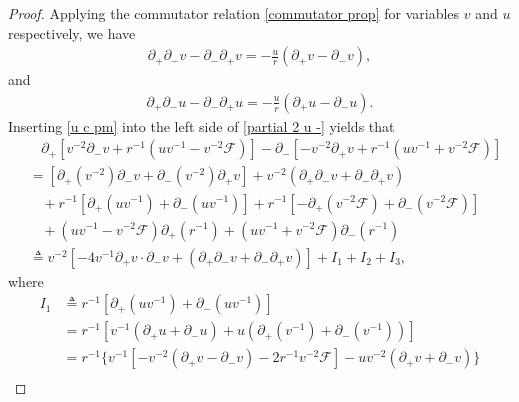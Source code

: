 \documentclass[10pt,leqno]{amsart}
\numberwithin{equation}{section}
\begin{document}
\begin{proof}
	Applying the commutator relation \eqref{commutator prop} for variables $v$ and $u$ respectively, we have
	\begin{equation}\label{partial 2 - }
		\begin{aligned}
			\partial_{+} \partial_{-} v - \partial_{-} \partial_{+} v =- \frac{u}{r} \left(  \partial_{+}v - \partial_{-}v\right)   ,
		\end{aligned}
	\end{equation}
	and
	\begin{equation} \label{partial 2 u -}
		\begin{aligned}
			\partial_{+} \partial_{-} u - \partial_{-} \partial_{+} u = - \frac{u}{r} (\partial_{+}u - \partial_{-}u).
		\end{aligned}
	\end{equation}
	Inserting \eqref{u c pm} into the left side of \eqref{partial 2 u -} yields that
	\begin{equation}\label{I123}
		\begin{aligned}
			& \ \ \ \ \partial_{+} [v^{-2} \partial_{-} v + r^{-1} (uv^{-1}-v^{-2} \mathcal{F})]  - \partial_{-} [-v^{-2} \partial_{+} v + r^{-1} (uv^{-1}+v^{-2} \mathcal{F})]  \\
			& = [\partial_{+} (v^{-2}) \partial_{-} v + \partial_{-} (v^{-2}) \partial_{+} v] + v^{-2} (\partial_{+} \partial_{-} v + \partial_{-} \partial_{+} v) \\
			& \ \ \ \  + r^{-1} [ \partial_{+} (uv^{-1}) + \partial_{-} (uv^{-1}) ]  + r^{-1} [ -\partial_{+} (v^{-2}\mathcal{F}) + \partial_{-} (v^{-2}\mathcal{F}) ] \\
			& \ \ \ \  + (uv^{-1} - v^{-2} \mathcal{F})\partial_{+} (r^{-1}) + (uv^{-1} + v^{-2} \mathcal{F})\partial_{-} (r^{-1})  \\
			& \triangleq  v^{-2} [ -4 v^{-1}\partial_{+} v \cdot \partial_{-} v  + (\partial_{+} \partial_{-} v + \partial_{-} \partial_{+} v) ] + I_{1} + I_{2} + I_{3},
		\end{aligned}
	\end{equation}
	where 
	\begin{equation} \label{I1}
		\begin{aligned}
			I_{1} & \triangleq r^{-1} [ \partial_{+} (uv^{-1}) + \partial_{-} (uv^{-1}) ] \\
			& = r^{-1} [ v^{-1} (\partial_{+}u + \partial_{-}u) + u ( \partial_{+} (v^{-1}) + \partial_{-} (v^{-1}) ) ] \\
			& = r^{-1} \{v^{-1} [- v^{-2} ( \partial_{+}v-\partial_{-}v) - 2r^{-1}v^{-2}\mathcal{F}]   - u v^{-2}( \partial_{+} v + \partial_{-} v )\}     \\

\end{aligned}
\end{equation}
\end{proof}
\end{document}
